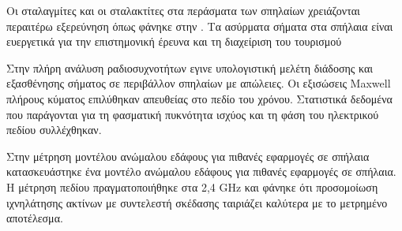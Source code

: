     Οι σταλαγμίτες και οι σταλακτίτες στα περάσματα των σπηλαίων χρειάζονται περαιτέρω
    εξερεύνηση όπως φάνηκε στην \cite{soo_propagation_2018}.
    Τα ασύρματα σήματα στα σπήλαια είναι ευεργετικά για την επιστημονική έρευνα και τη 
    διαχείριση του τουρισμού

    Στην πλήρη ανάλυση ραδιοσυχνοτήτων \cite{pingenot_full_2005} εγινε υπολογιστική μελέτη
    διάδοσης και εξασθένησης σήματος σε περιβάλλον σπηλαίων με απώλειες. Οι εξισώσεις Maxwell
    πλήρους κύματος επιλύθηκαν απευθείας στο πεδίο του χρόνου. Στατιστικά δεδομένα που παράγονται
    για τη φασματική πυκνότητα ισχύος και τη φάση του ηλεκτρικού πεδίου συλλέχθηκαν.

    Στην μέτρηση μοντέλου ανώμαλου εδάφους για πιθανές εφαρμογές σε σπήλαια \cite{soo_measurement_2019}
    κατασκευάστηκε ένα μοντέλο ανώμαλου εδάφους για πιθανές εφαρμογές σε σπήλαια. Η μέτρηση πεδίου
    πραγματοποιήθηκε στα 2,4 GHz και φάνηκε ότι προσομοίωση ιχνηλάτησης ακτίνων με συντελεστή 
    σκέδασης ταιριάζει καλύτερα με το μετρημένο αποτέλεσμα.